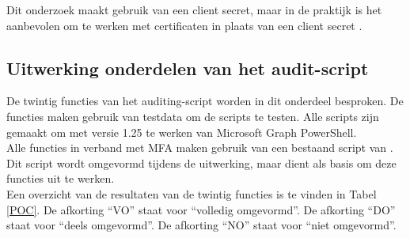 Dit onderzoek maakt gebruik van een client secret, maar in de praktijk is het aanbevolen om te werken met certificaten in plaats van een client secret \autocite{Terlisten2022}.

\subsection{Uitwerking onderdelen van het audit-script}


De twintig functies van het auditing-script worden in dit onderdeel besproken. De functies maken gebruik van testdata om de scripts te testen. Alle scripts zijn gemaakt om met versie 1.25 te werken van Microsoft Graph PowerShell. \\

Alle functies in verband met \ac{MFA} maken gebruik van een bestaand script van \textcite{Allen2023}. Dit script wordt omgevormd tijdens de uitwerking, maar dient als basis om deze functies uit te werken. \\

Een overzicht van de resultaten van de twintig functies is te vinden in Tabel \ref{POC}. De afkorting “VO” staat voor “volledig omgevormd”. De afkorting “DO” staat voor “deels omgevormd”. De afkorting “NO” staat voor “niet omgevormd”. 

